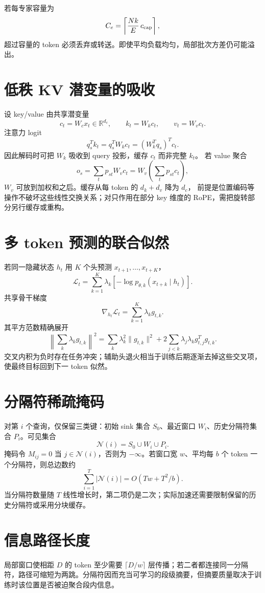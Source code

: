 \documentclass[11pt]{article}
\numberwithin{equation}{section}
\newcommand{\R}{\mathbb{R}}
\newcommand{\1}{\mathbf{1}}
\newcommand{\cN}{\mathcal{N}}
\newcommand{\cL}{\mathcal{L}}
\begin{document}
若每专家容量为
\begin{equation}
 C_e=\left\lceil\frac{Nk}{E}\,c_{\rm cap}\right\rceil,
\end{equation}
超过容量的 token 必须丢弃或转送。即使平均负载均匀，局部批次方差仍可能溢出。

\section{低秩 KV 潜变量的吸收}

设 key/value 由共享潜变量
\begin{equation}
 c_t=W_cx_t\in\R^{d_c},\qquad
 k_t=W_kc_t,\qquad v_t=W_vc_t.
\end{equation}
注意力 logit
\begin{equation}
 q_s^Tk_t=q_s^TW_kc_t=(W_k^Tq_s)^Tc_t.
\end{equation}
因此解码时可把 $W_k$ 吸收到 query 投影，缓存 $c_t$ 而非完整 $k_t$。
若 value 聚合
\begin{equation}
 o_s=\sum_tp_{st}W_vc_t=W_v\left(\sum_tp_{st}c_t\right),
\end{equation}
$W_v$ 可放到加权和之后。缓存从每 token 的 $d_k+d_v$ 降为 $d_c$，
前提是位置编码等操作不破坏这些线性交换关系；对只作用在部分 key 维度的 RoPE，需把旋转部分另行缓存或重构。

\section{多 token 预测的联合似然}

若同一隐藏状态 $h_t$ 用 $K$ 个头预测 $x_{t+1},\ldots,x_{t+K}$，
\begin{equation}
 \cL_t=\sum_{k=1}^{K}\lambda_k
 [-\log p_{\theta,k}(x_{t+k}\mid h_t)].
\end{equation}
共享骨干梯度
\begin{equation}
 \nabla_{h_t}\cL_t=\sum_{k=1}^{K}\lambda_k g_{t,k}.
\end{equation}
其平方范数精确展开
\begin{equation}
 \left\|\sum_k\lambda_kg_{t,k}\right\|^2
 =\sum_k\lambda_k^2\|g_{t,k}\|^2
 +2\sum_{j<k}\lambda_j\lambda_k g_{t,j}^Tg_{t,k}.
\end{equation}
交叉内积为负时存在任务冲突；辅助头退火相当于训练后期逐渐去掉这些交叉项，
使最终目标回到下一 token 似然。

\section{分隔符稀疏掩码}
对第 $i$ 个查询，仅保留三类键：初始 sink 集合 $S_0$、最近窗口 $W_i$、历史分隔符集合 $P_i$。可见集合
\begin{equation}
  \cN(i)=S_0\cup W_i\cup P_i.
\end{equation}
掩码令 $M_{ij}=0$ 当 $j\in\cN(i)$，否则为 $-\infty$。若窗口宽 $w$、平均每 $b$ 个 token 一个分隔符，则总边数约
\begin{equation}
  \sum_{i=1}^{T}|\cN(i)|
  =O(Tw+T^2/b).
\end{equation}
当分隔符数量随 $T$ 线性增长时，第二项仍是二次；实际加速还需要限制保留的历史分隔符或采用分块缓存。

\section{信息路径长度}
局部窗口使相距 $D$ 的 token 至少需要 $\lceil D/w\rceil$ 层传播；若二者都连接同一分隔符，路径可缩短为两跳。分隔符因而充当可学习的段级摘要，但摘要质量取决于训练时该位置是否被迫聚合段内信息。
\end{document}
